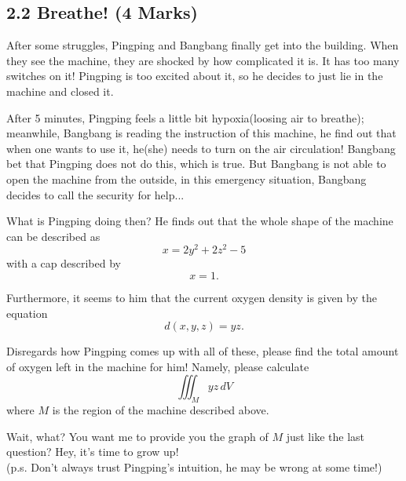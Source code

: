 \documentclass[12pt]{article}
\begin{document}
\subsection*{2.2 Breathe! (4 Marks)}
\par After some struggles, Pingping and Bangbang finally get into the building. When they see the machine, they are 
shocked by how complicated it is. It has too many switches on it! Pingping is too excited about it, so he decides to just lie in the machine and closed it. 

\par After 5 minutes, Pingping feels a little bit hypoxia(loosing air to breathe); meanwhile, Bangbang is reading the 
instruction of this machine, he find out that when one wants to use it, he(she) needs to turn on the air 
circulation! Bangbang bet that Pingping does not do this, which is true. But Bangbang is not able to open the machine
from the outside, in this emergency situation, Bangbang decides to call the security for help...

\par What is Pingping doing then? He finds out that the whole shape of the machine can be described as 
\begin{equation*}
    x = 2y^2 + 2z^2 - 5 
\end{equation*}
with a cap described by 
\begin{equation*}
    x = 1.
\end{equation*}
 
\par Furthermore, it seems to him that the current oxygen density is given by the equation 
\begin{equation*}
    d(x,y,z) = yz. 
\end{equation*}

\par Disregards how Pingping comes up with all of these, please find the total amount of oxygen left in the 
machine for him! Namely, please calculate 
\begin{equation*}
    \iiint_M yz\,dV
\end{equation*}
where $M$ is the region of the machine described above. 

\par Wait, what? You want me to provide you the graph of $M$ just like the last question? Hey, it's time to grow 
up! \\
\hfill (p.s. Don't always trust Pingping's intuition, he may be wrong at some time!)
\end{document}

